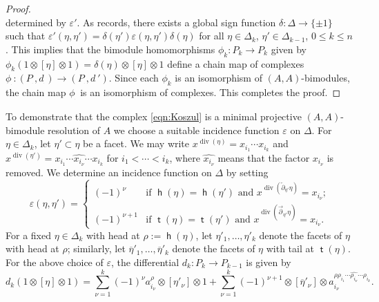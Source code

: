 \documentclass[11pt,a4paper]{amsart}
\numberwithin{equation}{section}
\theoremstyle{definition}
\theoremstyle{remark}
\renewcommand{\div}{\operatorname{div}}
\newcommand{\head}{\operatorname{\mathsf{h}}}
\newcommand{\tail}{\operatorname{\mathsf{t}}}
\def\lbdot{_{{^{_{_{_{_{_{\bullet}}}}}}}}}
\begin{document}
\begin{proof}
$$$$
determined by $\varepsilon'$. As \cite[Theorem 6.2.2]{BrunsHerzog} records, there exists a global sign function $\delta\colon \Delta \rightarrow \{\pm 1 \}$ such that $\varepsilon'(\eta,\eta')=\delta(\eta')\varepsilon(\eta,\eta')\delta(\eta)$ for all $\eta \in \Delta_k$, $\eta' \in \Delta_{k-1}$, $0 \leq k \leq n$. This implies that the bimodule homomorphisms $\phi_k\colon P_k \rightarrow P_k$ given by $\phi_k(1 \otimes [\eta]\otimes 1)=\delta(\eta)\otimes [\eta]\otimes 1$ define a chain map of complexes $\phi\lbdot\!\! \colon (P\lbdot\!\!,d\lbdot\!\!)  \rightarrow (P\lbdot\!\!,d_{{^{^{_{_{_{_{\bullet}}}}}}}}'\!\!)$. Since each $\phi_k$ is an isomorphism of $(A,A)$-bimodules, the chain map $\phi\lbdot\!\!$ is an isomorphism of complexes. This completes the proof.
\end{proof}

To demonstrate that the complex \eqref{eqn:Koszul} is a minimal projective $(A,A)$-bimodule resolution of $A$ we choose a suitable incidence function $\varepsilon$ on $\Delta$. For $\eta \in \Delta_k$, let $\eta' \subset \eta$ be a facet. We may write $x^{\div(\eta)}=x_{i_1}\cdots x_{i_k}$ and $x^{\div(\eta')}=x_{i_1}\cdots \widehat{x_{i_{\nu}}}\cdots x_{i_k}$ for $i_1<\cdots <i_k$, where $ \widehat{x_{i_{\nu}}}$ means that the factor $x_{i_{\nu}}$ is removed. We determine an incidence function on $\Delta$ by setting
\[
\varepsilon(\eta,\eta')=\left\{
\begin{array}{ll}
(-1)^{\nu} & \text{if $\head(\eta)=\head(\eta')$ and $x^{\div( \overleftarrow{\partial}_{\!\eta'}\eta)}=x_{i_{\nu}}$;} \\
(-1)^{\nu +1} & \text{if $\tail(\eta)=\tail(\eta')$ and $x^{\div(  \overrightarrow{\partial}_{\!\eta'}\eta)}=x_{i_{\nu}}$.}
\end{array} \right.
\]
For a fixed $\eta \in \Delta_k$ with head at $\rho:=\head(\eta)$, let $\eta'_1,\dots,\eta'_k$ denote the facets of $\eta$ with head at $\rho$; similarly, let $\overline{\eta}'_1,\dots,\overline{\eta}'_k$ denote the facets of $\eta$ with tail at $\tail(\eta)$. For the above choice of $\varepsilon$, the differential $d_k\colon P_k \rightarrow P_{k-1}$ is given by
\begin{equation}
\label{eqn:revisedcomplex}
d_k(1\otimes [\eta]\otimes 1)=\sum_{\nu=1}^k(-1)^{\nu} a_{i_{\nu}}^{\rho} \otimes [\eta'_{\nu}]\otimes 1 + \sum_{\nu=1}^k(-1)^{\nu+1} \otimes [\overline{\eta}'_{\nu}]\otimes a_{i_{\nu}}^{\rho \rho_{i_{1}}\cdots \widehat{\rho_{i_{\nu}}}\cdots \rho_{i_{k}}} .
\end{equation}
\end{document}
